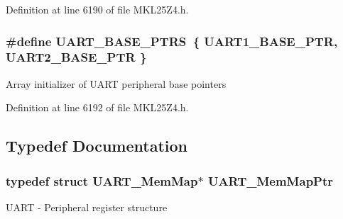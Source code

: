Definition at line 6190 of file M\+K\+L25\+Z4.\+h.

\subsubsection[{\texorpdfstring{U\+A\+R\+T\+\_\+\+B\+A\+S\+E\+\_\+\+P\+T\+RS}{UART_BASE_PTRS}}]{\setlength{\rightskip}{0pt plus 5cm}\#define U\+A\+R\+T\+\_\+\+B\+A\+S\+E\+\_\+\+P\+T\+RS~\{ {\bf U\+A\+R\+T1\+\_\+\+B\+A\+S\+E\+\_\+\+P\+TR}, {\bf U\+A\+R\+T2\+\_\+\+B\+A\+S\+E\+\_\+\+P\+TR} \}}\hypertarget{group___u_a_r_t___peripheral_ga7b34a38b9492a1e1007b2f66383aef17}{}\label{group___u_a_r_t___peripheral_ga7b34a38b9492a1e1007b2f66383aef17}
Array initializer of U\+A\+RT peripheral base pointers 

Definition at line 6192 of file M\+K\+L25\+Z4.\+h.



\subsection{Typedef Documentation}
\subsubsection[{\texorpdfstring{U\+A\+R\+T\+\_\+\+Mem\+Map\+Ptr}{UART_MemMapPtr}}]{\setlength{\rightskip}{0pt plus 5cm}typedef struct {\bf U\+A\+R\+T\+\_\+\+Mem\+Map}$\ast$ {\bf U\+A\+R\+T\+\_\+\+Mem\+Map\+Ptr}}\hypertarget{group___u_a_r_t___peripheral_ga306cf44b593fadbb29a065f42e3f68f0}{}\label{group___u_a_r_t___peripheral_ga306cf44b593fadbb29a065f42e3f68f0}
U\+A\+RT -\/ Peripheral register structure 